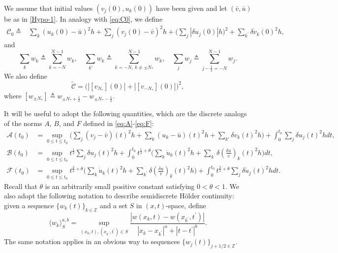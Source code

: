 \documentclass[a4paper,oneside,11pt]{article}
\numberwithin{equation}{section}
\begin{document}
We assume that initial values $(v_j(0),u_k(0))$ have been given and let $(\bar{v},\bar{u})$ be as in \eqref{Hypo-1}. In analogy with \eqref{eq:C0}, we define
\begin{equation}\label{eq:c00}
\begin{aligned}
  \mathscr{C}_{0}\triangleq &\sum_{k} (u_{k}(0)-\bar u)^{2}h+\sum_{j}(v_{j}(0)-\bar v)^{2}h+\Big(\sum_{j}|\delta u_{j}(0)|h\Big)^{2}%
  +\sum_{k^{\prime}}\delta v_{k}(0)^{2}h,
\end{aligned}
\end{equation}
and
\[\sum_{k}w_{k}\triangleq\sum_{k=-N}^{N-1}w_{k},\quad\sum_{k'}w_{k}\triangleq\sum_{k=-N,~k\neq \pm N_*   }^{N-1}w_{k},\quad\sum_{j}w_{j}\triangleq\sum_{j-\frac12=-N}^{N-1}w_{j}%
.\]
We also define
\begin{equation}\label{eq:c10}
\widetilde{\mathscr{C}}=\big(|[v_{N_*}](0)|+|[v_{-N_*}](0)|\big)^{2},
\end{equation}
where \([w_{\pm N_* }]\triangleq w_{\pm N_* +\frac12}-w_{\pm N_* -\frac12}\).

It will be useful to adopt the following quantities, which are the discrete analogs of the norms \(A\), \(B\), and \(F\) defined in \eqref{eq:A}-\eqref{eq:F}:
\begin{align*}
\mathscr{A}(t_0) &= \sup_{0\leq t\leq t_0}\Big(\sum_{j} (v_j-\bar v)(t)^{2}h+\sum_{k}(u_k-\bar u)(t)^2h+ \sum_{k'}\delta v_{k}(t)^2h%
\Big) +\int_{0}^{t_{0}} \sum\limits_{j}\delta u_{j}(t)^{2}h dt,\\
\mathscr{B}(t_0) &= \sup_{0\leq t\leq t_{0}} t^{\frac{1}{2}}\sum_{j}\delta u_{j}(t)^{2}h +\int_{0}^{t_{0}}t^{\frac{1}{2}+\theta}\Big(\sum_{k}\dot{u}_{k}(t)^{2}h+\sum\limits_{k^{\prime}}\delta\left(\frac{\delta u}{v}\right)_{k}(t)^{2}h\Big)dt, \\
\mathscr{F}(t_{0})& =\sup_{0\leq t\leq t_{0}} t^{\frac{3}{2}+\theta}\Big(\sum_{k}\dot{u}_{k}(t)^{2}h+\sum_{k^{\prime}}\delta\left(\frac{\delta u}{v}\right)_{k}(t)^{2}h\Big)+\int_{0}^{t_{0}} t^{\frac{3}{2}+\theta}\sum\limits_{j}\delta\dot{u}_{j}(t)^{2}h dt.
\end{align*}
Recall that $\theta$ is an arbitrarily small positive constant satisfying \(0<\theta<1\).
We also adopt the following notation to describe semidiscrete H\"{o}lder continuity: given a sequence \(\{w_{k}(t)\}_{k\in\mathbb{Z}}\) and a set \(S\) in \((x,t)\)-space, define
\[\langle w_{k}\rangle_{S}^{a,b}=\sup_{(x_{k},t),(x_{k^{\prime}},t^{\prime})\in S}\frac{|w(x_{k},t)-w(x_{k^{\prime}},t^{\prime})|}{|x_{k}-x_{k^{\prime}}|^{a}+|t-t^{\prime}|^{b}}.\]
The same notation applies in an obvious way to sequences \(\{w_{j}(t)\}_{j+1/2\in\mathbb{Z}}\).
\end{document}
